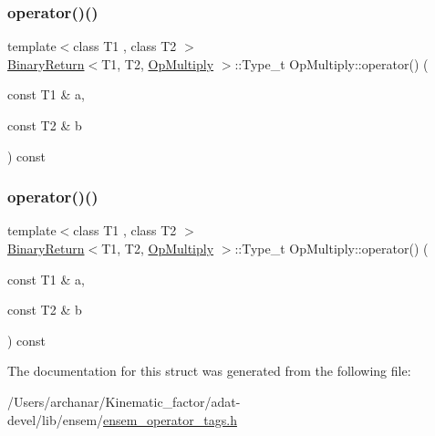 \mbox{\label{structOpMultiply_a47917bc9d52d19692e9716a60938d364}} 
\subsubsection{\texorpdfstring{operator()()}{operator()()}\hspace{0.1cm}{\footnotesize\ttfamily [2/3]}}
{\footnotesize\ttfamily template$<$class T1 , class T2 $>$ \\
\mbox{\hyperlink{structBinaryReturn}{Binary\+Return}}$<$T1, T2, \mbox{\hyperlink{structOpMultiply}{Op\+Multiply}} $>$\+::Type\+\_\+t Op\+Multiply\+::operator() (\begin{DoxyParamCaption}\item[{const T1 \&}]{a,  }\item[{const T2 \&}]{b }\end{DoxyParamCaption}) const\hspace{0.3cm}{\ttfamily [inline]}}

\mbox{\label{structOpMultiply_a47917bc9d52d19692e9716a60938d364}} 
\subsubsection{\texorpdfstring{operator()()}{operator()()}\hspace{0.1cm}{\footnotesize\ttfamily [3/3]}}
{\footnotesize\ttfamily template$<$class T1 , class T2 $>$ \\
\mbox{\hyperlink{structBinaryReturn}{Binary\+Return}}$<$T1, T2, \mbox{\hyperlink{structOpMultiply}{Op\+Multiply}} $>$\+::Type\+\_\+t Op\+Multiply\+::operator() (\begin{DoxyParamCaption}\item[{const T1 \&}]{a,  }\item[{const T2 \&}]{b }\end{DoxyParamCaption}) const\hspace{0.3cm}{\ttfamily [inline]}}



The documentation for this struct was generated from the following file\+:\begin{DoxyCompactItemize}
\item 
/\+Users/archanar/\+Kinematic\+\_\+factor/adat-\/devel/lib/ensem/\mbox{\hyperlink{adat-devel_2lib_2ensem_2ensem__operator__tags_8h}{ensem\+\_\+operator\+\_\+tags.\+h}}\end{DoxyCompactItemize}
